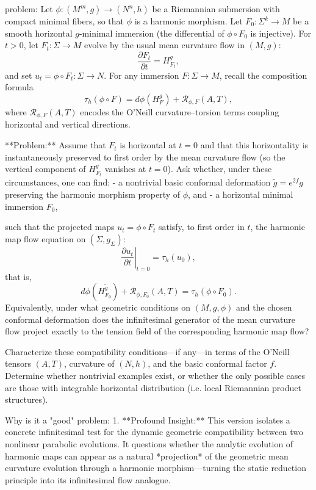 problem:  
Let $\phi:(M^{m},g)\to (N^{n},h)$ be a Riemannian submersion with compact minimal fibers, so that $\phi$ is a harmonic morphism.  
Let $F_0:\Sigma^k\to M$ be a smooth horizontal $g$-minimal immersion (the differential of $\phi\circ F_0$ is injective).  
For $t>0$, let $F_t:\Sigma\to M$ evolve by the usual mean curvature flow in $(M,g)$:  
\[
\frac{\partial F_t}{\partial t}=H_{F_t}^g,
\]
and set $u_t=\phi\circ F_t:\Sigma\to N$.  
For any immersion $F:\Sigma\to M$, recall the composition formula
\[
\tau_h(\phi\circ F) = d\phi(H_F^g) + \mathcal{R}_{\phi,F}(A,T),
\]
where $\mathcal{R}_{\phi,F}(A,T)$ encodes the O’Neill curvature–torsion terms coupling horizontal and vertical directions.  

**Problem:**  
Assume that $F_t$ is horizontal at $t=0$ and that this horizontality is instantaneously preserved to first order by the mean curvature flow (so the vertical component of $H_{F_t}^g$ vanishes at $t=0$).  
Ask whether, under these circumstances, one can find:  
- a nontrivial basic conformal deformation $\tilde g=e^{2f}g$ preserving the harmonic morphism property of $\phi$, and  
- a horizontal minimal immersion $F_0$,  

such that the projected maps $u_t=\phi\circ F_t$ satisfy, to first order in $t$, the harmonic map flow equation on $(\Sigma,g_\Sigma)$:
\[
\left.\frac{\partial u_t}{\partial t}\right|_{t=0} 
= \tau_h(u_0),
\]
that is,
\[
d\phi(H_{F_0}^{\tilde g})+\mathcal{R}_{\phi,F_0}(A,T) = \tau_h(\phi\circ F_0).
\]
Equivalently, under what geometric conditions on $(M,g,\phi)$ and the chosen conformal deformation does the infinitesimal generator of the mean curvature flow project exactly to the tension field of the corresponding harmonic map flow?

Characterize these compatibility conditions—if any—in terms of the O’Neill tensors $(A,T)$, curvature of $(N,h)$, and the basic conformal factor $f$.  
Determine whether nontrivial examples exist, or whether the only possible cases are those with integrable horizontal distribution (i.e. local Riemannian product structures).  

Why is it a "good" problem:  
1. **Profound Insight:**  
   This version isolates a concrete infinitesimal test for the dynamic geometric compatibility between two nonlinear parabolic evolutions. It questions whether the analytic evolution of harmonic maps can appear as a natural *projection* of the geometric mean curvature evolution through a harmonic morphism—turning the static reduction principle into its infinitesimal flow analogue.  

